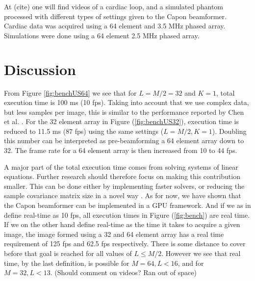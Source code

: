 \documentclass[conference]{IEEEtran}
\begin{document}
At (cite) one will find videos of a cardiac loop, 
and a simulated phantom 
processed with different types of settings given to the Capon beamformer. Cardiac data was acquired using a 64 element and 3.5 MHz phased array. Simulations were done using a 64 element 2.5 MHz phased array. 

\section{Discussion}
From Figure \ref{fig:benchUS64} we see that for $L = M/2 = 32$ and $K=1$, total execution time is 100 ms (10 fps). Taking into account that we use complex data, but less samples per image, this is similar to the performance reported by Chen et al. \cite{Chen2011}. For the 32 element array in Figure (\ref{fig:benchUS32}), execution time is reduced to 11.5 ms (87 fps) using the same settings ($L=M/2, K = 1$). Doubling this number can be interpreted as pre-beamforming a 64 element array down to 32. The frame rate for a 64 element array is then increased from 10 to 44 fps.

A major part of the total execution time comes from solving systems of linear equations. Further research should therefore focus on making this contribution smaller. This can be done either by implementing faster solvers, or reducing the sample covariance matrix size in a novel way \cite{Nilsen2009}. %
As for now, we have shown that the Capon beamformer can be implemented in a GPU framework. And if we as in \cite{Chen2011} define real-time as 10 fps, all execution times  in Figure (\ref{fig:bench}) are real time. If we on the other hand define real-time as the time it takes to acquire a given image, the image formed using a 32 and 64 element array has a real time requirement of 125 fps and 62.5 fps respectively. There is some distance to cover before that goal is reached for all values of $L \le M/2$. However we see that real time, by the last definition, is possible for $M=64, L < 16$, and for $M = 32, L < 13$. 
(Should comment on videos? Ran out of space)


\end{document}
